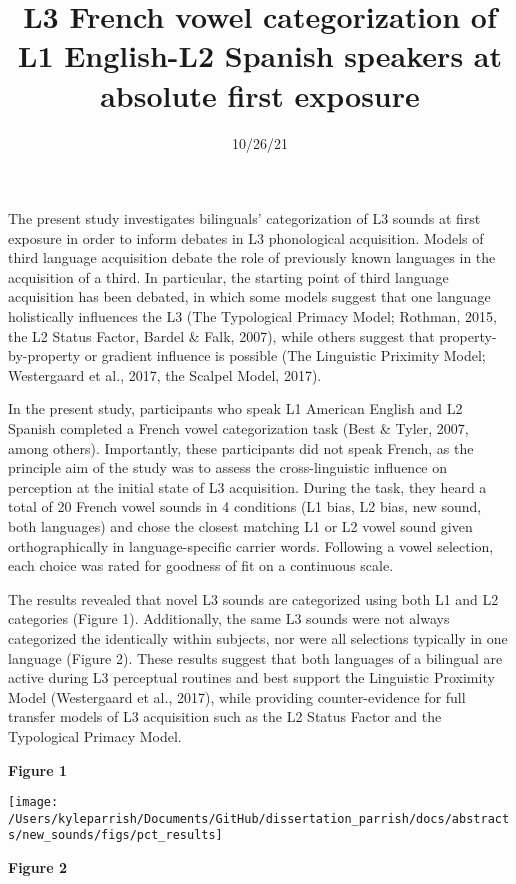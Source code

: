 \documentclass[
  12pt,
]{article}
\title{L3 French vowel categorization of L1 English-L2 Spanish speakers
at absolute first exposure}
\author{}
\date{\vspace{-2.5em}10/26/21}
\begin{document}
\maketitle

The present study investigates bilinguals' categorization of L3 sounds
at first exposure in order to inform debates in L3 phonological
acquisition. Models of third language acquisition debate the role of
previously known languages in the acquisition of a third. In particular,
the starting point of third language acquisition has been debated, in
which some models suggest that one language holistically influences the
L3 (The Typological Primacy Model; Rothman, 2015, the L2 Status Factor,
Bardel \& Falk, 2007), while others suggest that property-by-property or
gradient influence is possible (The Linguistic Priximity Model;
Westergaard et al., 2017, the Scalpel Model, 2017).

In the present study, participants who speak L1 American English and L2
Spanish completed a French vowel categorization task (Best \& Tyler,
2007, among others). Importantly, these participants did not speak
French, as the principle aim of the study was to assess the
cross-linguistic influence on perception at the initial state of L3
acquisition. During the task, they heard a total of 20 French vowel
sounds in 4 conditions (L1 bias, L2 bias, new sound, both languages) and
chose the closest matching L1 or L2 vowel sound given orthographically
in language-specific carrier words. Following a vowel selection, each
choice was rated for goodness of fit on a continuous scale.

The results revealed that novel L3 sounds are categorized using both L1
and L2 categories (Figure 1). Additionally, the same L3 sounds were not
always categorized the identically within subjects, nor were all
selections typically in one language (Figure 2). These results suggest
that both languages of a bilingual are active during L3 perceptual
routines and best support the Linguistic Proximity Model (Westergaard et
al., 2017), while providing counter-evidence for full transfer models of
L3 acquisition such as the L2 Status Factor and the Typological Primacy
Model.

\newpage

\textbf{Figure 1}

\texttt{[image: /Users/kyleparrish/Documents/GitHub/dissertation\_parrish/docs/abstracts/new\_sounds/figs/pct\_results]}

\textbf{Figure 2}
\end{document}
